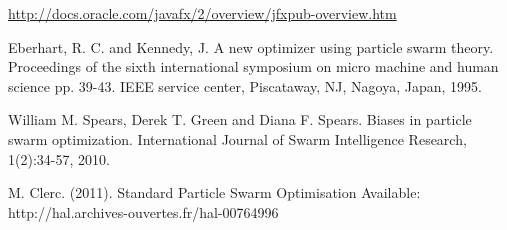\documentclass{article}
\begin{document}
\begin{thebibliography}{1}

 \url{http://docs.oracle.com/javafx/2/overview/jfxpub-overview.htm}	


Eberhart, R. C. and Kennedy, J. A new optimizer using particle swarm theory. Proceedings of the sixth international symposium on micro machine and human science pp. 39-43. IEEE service center, Piscataway, NJ, Nagoya, Japan, 1995.




William M. Spears, Derek T. Green and Diana F. Spears. Biases in particle swarm optimization. International Journal of Swarm Intelligence Research, 1(2):34-57, 2010.




M. Clerc. (2011). Standard Particle Swarm Optimisation Available: http://hal.archives-ouvertes.fr/hal-00764996 

	
\end{thebibliography}
\end{document}
